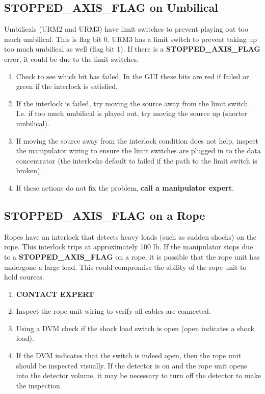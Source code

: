 \subsection{STOPPED\_AXIS\_FLAG on Umbilical}
  Umbilicals (URM2 and URM3) have limit switches to prevent
playing out too much umbilical.  This is flag bit 0.  URM3 has
a limit switch to prevent taking up too much umbilical as well
(flag bit 1).  If there is a {\bf STOPPED\_AXIS\_FLAG} error, it
could be due to the limit switches.   
\begin{enumerate}
\item  Check to see which bit has
  failed.  In the GUI these bits are red if failed or green if the
  interlock is satisfied.  
\item If the interlock is failed, try moving the source away from
  the limit switch.  I.e. if too much umbilical is played out, 
  try moving the source up (shorter umbilical).
  
\item If moving the source away from the interlock condition does
  not help, inspect the manipulator wiring to ensure the limit switches
  are plugged in to the data concentrator (the interlocks default to
  failed if  the path to the limit switch is broken).
 
\item If these actions do not fix the problem, {\bf call a manipulator
  expert}.

\end{enumerate}


\subsection{STOPPED\_AXIS\_FLAG on a Rope}
  Ropes have an interlock that detects heavy loads (such as sudden
shocks) on the rope.  This interlock trips at approximately 100 lb.
If the manipulator stops due to a {\bf STOPPED\_AXIS\_FLAG} on
a rope, it is possible that the rope unit has undergone a large
load.  This could compromise the ability of the rope unit to hold
sources.  
\begin{enumerate}
\item {\bf CONTACT EXPERT}
\item Inspect the rope unit wiring to verify all cables are connected.
\item Using a DVM check if the shock load switch is open (open indicates
  a shock load).  
\item If the DVM indicates that the switch  is indeed open, then the 
  rope unit should be inspected visually.  If the detector is on and
  the rope unit opens into the detector volume, it may be necessary to
  turn off the detector to make the inspection.
\end{enumerate}


